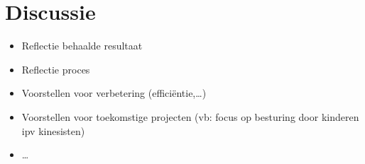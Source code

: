 \chapter{Discussie}

\begin{itemize}
\item Reflectie behaalde resultaat
\item Reflectie proces
\item Voorstellen voor verbetering (effici\"entie,\ldots)
\item Voorstellen voor toekomstige projecten (vb: focus op besturing door kinderen ipv kinesisten)
\item \ldots
\end{itemize}